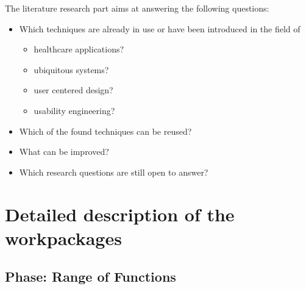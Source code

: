 \documentclass[a4paper,11pt]{article}
\providecommand*{\note}[1]{\small \textcolor{RoyalBlue}{\begin{minipage}{\textwidth}{#1}\end{minipage}}}
\begin{document}
The literature research part aims at answering the following questions:

\begin{itemize}
\item Which techniques are already in use or have been introduced in the field of
\begin{itemize}
\item healthcare applications?
\item ubiquitous systems?
\item user centered design?
\item usability engineering?
\end{itemize} 
\item Which of the found techniques can be reused?
\item What can be improved?
\item Which research questions are still open to answer?
\end{itemize}

\newpage
\section{Detailed description of the workpackages}
\label{sect:workplan}


\subsection{Phase: Range of Functions}
\label{sect:workplan:rangeoffucntions}
\end{document}
